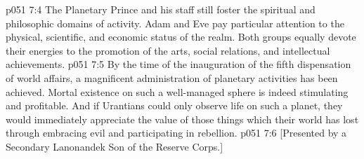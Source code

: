 \vs p051 7:4 The Planetary Prince and his staff still foster the spiritual and philosophic domains of activity. Adam and Eve pay particular attention to the physical, scientific, and economic status of the realm. Both groups equally devote their energies to the promotion of the arts, social relations, and intellectual achievements.
\vs p051 7:5 By the time of the inauguration of the fifth dispensation of world affairs, a magnificent administration of planetary activities has been achieved. Mortal existence on such a well\hyp{}managed sphere is indeed stimulating and profitable. And if Urantians could only observe life on such a planet, they would immediately appreciate the value of those things which their world has lost through embracing evil and participating in rebellion.
\vsetoff
\vs p051 7:6 [Presented by a Secondary Lanonandek Son of the Reserve Corps.]
\quizlink
